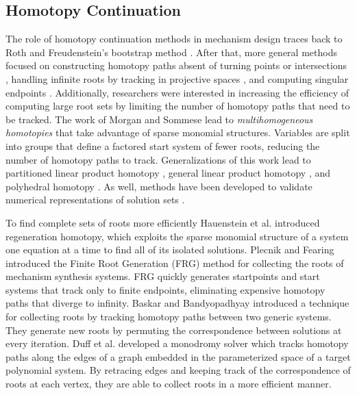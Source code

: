 \documentclass[journal]{IEEEtran}
\begin{document}
\subsection{Homotopy Continuation}
\label{sec:homotopy}

The role of homotopy continuation methods in mechanism design traces back to Roth and Freudenstein's bootstrap method \cite{rothSynthesisPathGeneratingMechanisms1963}. %
After that, more general methods focused on constructing homotopy paths absent of turning points or intersections \cite{zangwillPathwaysSolutionsFixed1981}, handling infinite roots by tracking in projective spaces \cite{wrightFindingAllSolutions1985}, and computing singular endpoints \cite{morganPowerSeriesMethod1992}. %
Additionally, researchers were interested in increasing the efficiency of computing large root sets by limiting the number of homotopy paths that need to be tracked. %
The work of Morgan and Sommese \cite{morganHomotopySolvingGeneral1987} lead to \emph{multihomogeneous homotopies} that take advantage of sparse monomial structures.  Variables are split into groups that define a factored start system of fewer roots, reducing the number of homotopy paths to track. %
Generalizations of this work lead to partitioned linear product homotopy \cite{verscheldeGBQAlgorithmConstructingStart1993,wiseAlgorithm801POLSYS2000}, general linear product homotopy \cite{verscheldeSymbolicHomotopyConstruction1993,verscheldeAlgorithm795PHCpack1999,suAlgorithm857POLSYS2006}, and polyhedral homotopy \cite{verscheldeHomotopiesExploitingNewton1994,huberPolyhedralMethodSolving1995,leykinPolyhedralHomotopies2019}. %
As well, methods have been developed to validate numerical representations of solution sets \cite{hauensteinAlgorithm921AlphaCertified2012,leykinTraceTest2018}.


To find complete sets of roots more efficiently Hauenstein et al. \cite{hauensteinRegenerationHomotopiesSolving2011} introduced regeneration homotopy, which exploits the sparse monomial structure of a system one equation at a time to find all of its isolated solutions. %
Plecnik and Fearing \cite{plecnikFindingOnlyFinite2017,plecnikStudyFindingFinite2017} introduced the Finite Root Generation (FRG) method for collecting the roots of mechanism synthesis systems.  FRG quickly generates startpoints and start systems that track only to finite endpoints, eliminating expensive homotopy paths that diverge to infinity. %
Baskar and Bandyopadhyay \cite{baskarAlgorithmComputeFinite2019} introduced a technique for collecting roots by tracking homotopy paths between two generic systems.  They generate new roots by permuting the correspondence between solutions at every iteration. %
Duff et al. \cite{duffSolvingPolynomialSystems} developed a monodromy solver which tracks homotopy paths along the edges of a graph embedded in the parameterized space of a target polynomial system.
By retracing edges and keeping track of the correspondence of roots at each vertex, they are able to collect roots in a more efficient manner. %
\end{document}
